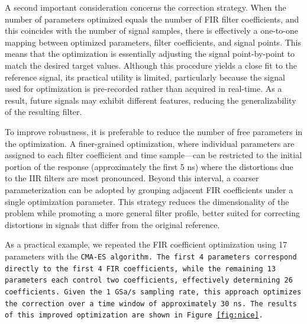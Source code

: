 A second important consideration concerns the correction strategy. 
When the number of parameters optimized equals the number of FIR filter coefficients, and this coincides with the number of signal samples, there is effectively a one-to-one mapping between optimized parameters, filter coefficients, and signal points. 
This means that the optimization is essentially adjusting the signal point-by-point to match the desired target values. 
Although this procedure yields a close fit to the reference signal, its practical utility is limited, particularly because the signal used for optimization is pre-recorded rather than acquired in real-time. 
As a result, future signals may exhibit different features, reducing the generalizability of the resulting filter.

To improve robustness, it is preferable to reduce the number of free parameters in the optimization.
A finer-grained optimization, where individual parameters are assigned to each filter coefficient and time sample—can be restricted to the initial portion of the response (approximately the first 5 ns) where the distortions due to the IIR filters are most pronounced.
Beyond this interval, a coarser parameterization can be adopted by grouping adjacent FIR coefficients under a single optimization parameter.
This strategy reduces the dimensionality of the problem while promoting a more general filter profile, better suited for correcting distortions in signals that differ from the original reference.

As a practical example, we repeated the FIR coefficient optimization using 17 parameters with the \tt{CMA-ES} algorithm. 
The first 4 parameters correspond directly to the first 4 FIR coefficients, while the remaining 13 parameters each control two coefficients, effectively determining 26 coefficients. 
Given the 1 GSa/s sampling rate, this approach optimizes the correction over a time window of approximately 30 ns. 
The results of this improved optimization are shown in Figure \ref{fig:nice}.

